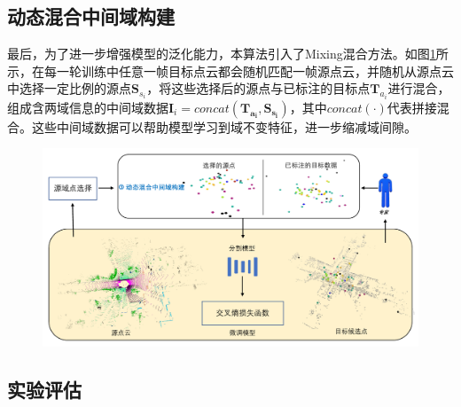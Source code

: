 




\subsection{动态混合中间域构建}
最后，为了进一步增强模型的泛化能力，本算法引入了Mixing混合方法。如图\ref{fig:3-4}所示，在每一轮训练中任意一帧目标点云都会随机匹配一帧源点云，并随机从源点云中选择一定比例的源点\(\mathbf{S}_{s_i}\)，将这些选择后的源点与已标注的目标点\(\mathbf{T}_{a_i}\)进行混合，组成含两域信息的中间域数据\(\mathbf{I}_i=concat(\mathbf{T_{a_i}},\mathbf{S_{s_i}})\)，其中\(concat(\cdot)\)代表拼接混合。这些中间域数据可以帮助模型学习到域不变特征，进一步缩减域间隙。

\vspace{-0.1cm}
\begin{figure}[h]
    \centering
    \includegraphics[width = \textwidth, scale=0.5]{ljx/figure/3-4.pdf}
    \label{fig:3-4}
\end{figure}
\vspace{-0.35cm}

\subsection{实验评估}
